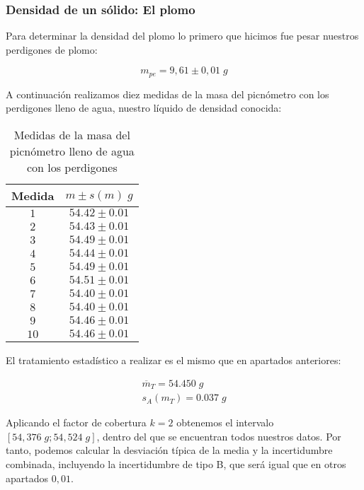 \documentclass[a4paper,12pt,titlepage]{article}
\begin{document}
\newpage

\subsubsection{Densidad de un sólido: El plomo}

Para determinar la densidad del plomo lo primero que hicimos fue pesar nuestros perdigones de plomo:

\begin{equation}
    m_{pe} = 9,61 \pm 0,01 \; g
\end{equation}

A continuación realizamos diez medidas de la masa del picnómetro con los perdigones lleno de agua, nuestro líquido de densidad conocida:

\begin{table}[h!]
    \centering
    \begin{tabular}{|c|c|}
    \hline
    Medida & $m \pm s(m) \; g$ \\ \hline
    $1$    & $54.42\pm0.01$ \\ \hline
    $2$    & $54.43\pm0.01$ \\ \hline
    $3$    & $54.49\pm0.01$ \\ \hline
    $4$    & $54.44\pm0.01$ \\ \hline
    $5$    & $54.49\pm0.01$ \\ \hline
    $6$    & $54.51\pm0.01$ \\ \hline
    $7$    & $54.40\pm0.01$ \\ \hline
    $8$    & $54.40\pm0.01$ \\ \hline
    $9$    & $54.46\pm0.01$ \\ \hline
    $10$   & $54.46\pm0.01$ \\ \hline
    \end{tabular}
    \caption{Medidas de la masa del picnómetro lleno de agua con los perdigones}
    \label{Masas Perdigones}
    \end{table}

El tratamiento estadístico a realizar es el mismo que en apartados anteriores:

\begin{gather}
    \overline{m}_{T} = 54.450 \; g \\
    s_{A}(m_{T}) = 0.037 \; g
\end{gather}

Aplicando el factor de cobertura $k=2$ obtenemos el intervalo $[54,376 \; g  ; 54,524 \; g]$, dentro del que se encuentran todos nuestros datos. Por tanto, podemos calcular la desviación típica de la media y la incertidumbre combinada, incluyendo la incertidumbre de tipo B, que será igual que en otros apartados $0,01$.
\end{document}
